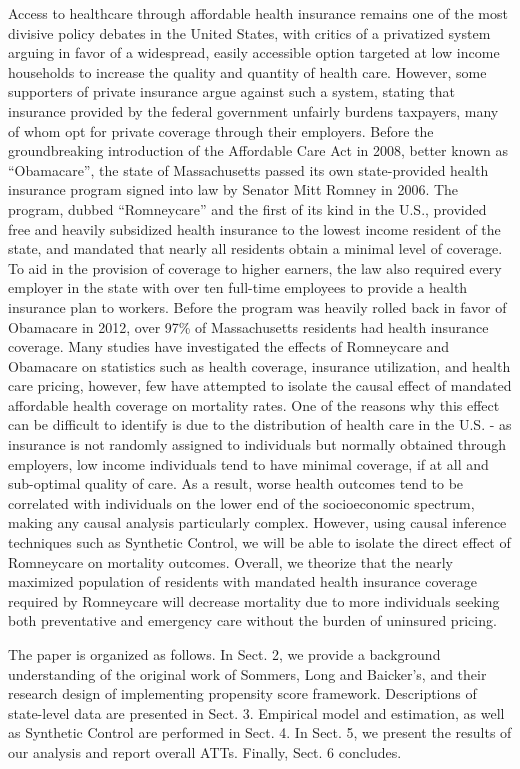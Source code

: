 \documentclass[
]{article}
\begin{document}
Access to healthcare through affordable health insurance remains one of
the most divisive policy debates in the United States, with critics of a
privatized system arguing in favor of a widespread, easily accessible
option targeted at low income households to increase the quality and
quantity of health care. However, some supporters of private insurance
argue against such a system, stating that insurance provided by the
federal government unfairly burdens taxpayers, many of whom opt for
private coverage through their employers. Before the groundbreaking
introduction of the Affordable Care Act in 2008, better known as
``Obamacare'', the state of Massachusetts passed its own state-provided
health insurance program signed into law by Senator Mitt Romney in 2006.
The program, dubbed ``Romneycare'' and the first of its kind in the
U.S., provided free and heavily subsidized health insurance to the
lowest income resident of the state, and mandated that nearly all
residents obtain a minimal level of coverage. To aid in the provision of
coverage to higher earners, the law also required every employer in the
state with over ten full-time employees to provide a health insurance
plan to workers. Before the program was heavily rolled back in favor of
Obamacare in 2012, over 97\% of Massachusetts residents had health
insurance coverage. Many studies have investigated the effects of
Romneycare and Obamacare on statistics such as health coverage,
insurance utilization, and health care pricing, however, few have
attempted to isolate the causal effect of mandated affordable health
coverage on mortality rates. One of the reasons why this effect can be
difficult to identify is due to the distribution of health care in the
U.S. - as insurance is not randomly assigned to individuals but normally
obtained through employers, low income individuals tend to have minimal
coverage, if at all and sub-optimal quality of care. As a result, worse
health outcomes tend to be correlated with individuals on the lower end
of the socioeconomic spectrum, making any causal analysis particularly
complex. However, using causal inference techniques such as Synthetic
Control, we will be able to isolate the direct effect of Romneycare on
mortality outcomes. Overall, we theorize that the nearly maximized
population of residents with mandated health insurance coverage required
by Romneycare will decrease mortality due to more individuals seeking
both preventative and emergency care without the burden of uninsured
pricing.

The paper is organized as follows. In Sect. 2, we provide a background
understanding of the original work of Sommers, Long and Baicker's, and
their research design of implementing propensity score framework.
Descriptions of state-level data are presented in Sect. 3. Empirical
model and estimation, as well as Synthetic Control are performed in
Sect. 4. In Sect. 5, we present the results of our analysis and report
overall ATTs. Finally, Sect. 6 concludes.
\end{document}
